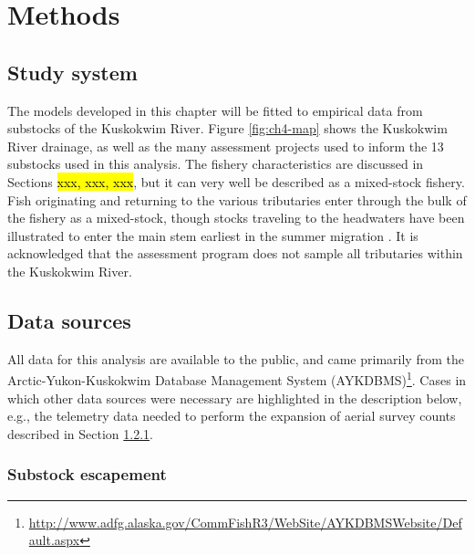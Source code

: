 \documentclass[12pt,]{book}
\let\rmarkdownfootnote\footnote%
\def\footnote{\protect\rmarkdownfootnote}
\theoremstyle{definition}
\theoremstyle{definition}
\theoremstyle{definition}
\theoremstyle{remark}
\begin{document}
\section{Methods}\label{methods}

\subsection{Study system}\label{study-system}

The models developed in this chapter will be fitted to empirical data
from substocks of the Kuskokwim River. Figure \ref{fig:ch4-map} shows
the Kuskokwim River drainage, as well as the many assessment projects
used to inform the 13 substocks used in this analysis. The fishery
characteristics are discussed in Sections \hl{xxx, xxx, xxx}, but it can
very well be described as a mixed-stock fishery. Fish originating and
returning to the various tributaries enter through the bulk of the
fishery as a mixed-stock, though stocks traveling to the headwaters have
been illustrated to enter the main stem earliest in the summer migration
\citep{smith-liller-2017}. It is acknowledged that the assessment
program does not sample all tributaries within the Kuskokwim River.

\subsection{Data sources}\label{data-sources}

All data for this analysis are available to the public, and came
primarily from the Arctic-Yukon-Kuskokwim Database Management System
(AYKDBMS)\footnote{\url{http://www.adfg.alaska.gov/CommFishR3/WebSite/AYKDBMSWebsite/Default.aspx}}.
Cases in which other data sources were necessary are highlighted in the
description below, e.g., the telemetry data needed to perform the
expansion of aerial survey counts described in Section
\ref{air-expansion}.

\subsubsection{Substock escapement}\label{air-expansion}
\end{document}
